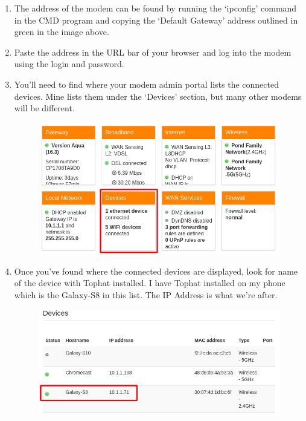 \documentclass{article}
\begin{document}
        \begin{enumerate}
            \item The address of the modem can be found by running the `ipconfig' command in the CMD program
            and copying the `Default Gateway' address outlined in green in the image above.
            \item Paste the address in the URL bar of your browser and log into the modem using the login and password.
            \item You'll need to find where your modem admin portal lists the connected devices. Mine lists them under
            the `Devices' section, but many other modems will be different.
            \begin{figure}[h!]
                \includegraphics[width=\linewidth]{images/modem-devices.png}
            \end{figure}
            \item Once you've found where the connected devices are displayed, look for name of the device with Tophat
            installed. I have Tophat installed on my phone which is the Galaxy-S8 in this list. The IP Address is what
            we're after.
            \begin{figure}[h!]
                \includegraphics[width=\linewidth]{images/modem-tophat-device.png}
            \end{figure}
        \end{enumerate}
\end{document}
